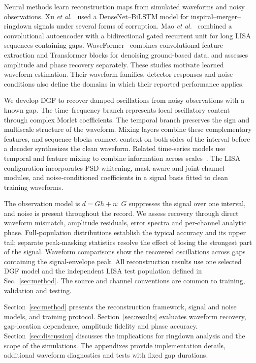 \documentclass[10pt,prd,aps,a4paper,twocolumn,superscriptaddress,nofootinbib,floatfix]{revtex4-2}
\begin{document}
Neural methods learn reconstruction maps from simulated waveforms and noisy observations. Xu \textit{et al.}~\cite{Xu_2024} used a DenseNet--BiLSTM model for inspiral--merger--ringdown signals under several forms of corruption. Mao \textit{et al.}~\cite{Mao:2025cae} combined a convolutional autoencoder with a bidirectional gated recurrent unit for long LISA sequences containing gaps. WaveFormer~\cite{Wang:2024waveformer} combines convolutional feature extraction and Transformer blocks for denoising ground-based data, and assesses amplitude and phase recovery separately. These studies motivate learned waveform estimation. Their waveform families, detector responses and noise conditions also define the domains in which their reported performance applies.

We develop DGF to recover damped oscillations from noisy observations with a known gap. The time--frequency branch represents local oscillatory content through complex Morlet coefficients. The temporal branch preserves the sign and multiscale structure of the waveform. Mixing layers combine these complementary features, and sequence blocks connect context on both sides of the interval before a decoder synthesizes the clean waveform. Related time-series models use temporal and feature mixing to combine information across scales~\cite{TSMixer2023,TimeMixer2024}. The LISA configuration incorporates PSD whitening, mask-aware and joint-channel modules, and noise-conditioned coefficients in a signal basis fitted to clean training waveforms.

The observation model is $d=Gh+n$: $G$ suppresses the signal over one interval, and noise is present throughout the record. We assess recovery through direct waveform mismatch, amplitude residuals, error spectra and per-channel analytic phase. Full-population distributions establish the typical accuracy and its upper tail; separate peak-masking statistics resolve the effect of losing the strongest part of the signal. Waveform comparisons show the recovered oscillations across gaps containing the signal-envelope peak. All reconstruction results use one selected DGF model and the independent LISA test population defined in Sec.~\ref{sec:method}. The source and channel conventions are common to training, validation and testing.

Section~\ref{sec:method} presents the reconstruction framework, signal and noise models, and training protocol. Section~\ref{sec:results} evaluates waveform recovery, gap-location dependence, amplitude fidelity and phase accuracy. Section~\ref{sec:discussion} discusses the implications for ringdown analysis and the scope of the simulations. The appendixes provide implementation details, additional waveform diagnostics and tests with fixed gap durations.
\end{document}
